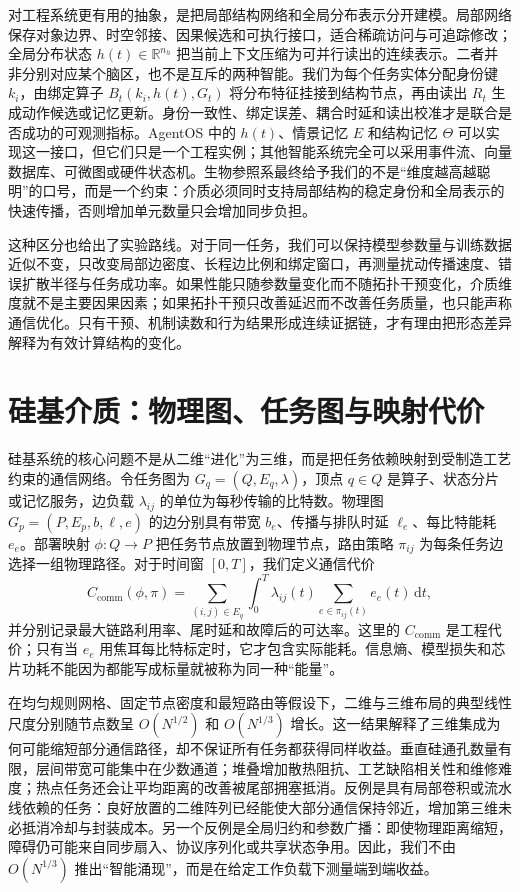 对工程系统更有用的抽象，是把局部结构网络和全局分布表示分开建模。局部网络保存对象边界、时空邻接、因果候选和可执行接口，适合稀疏访问与可追踪修改；全局分布状态 $h(t)\in\mathbb{R}^{n_h}$ 把当前上下文压缩为可并行读出的连续表示。二者并非分别对应某个脑区，也不是互斥的两种智能。我们为每个任务实体分配身份键 $k_i$，由绑定算子 $B_t(k_i,h(t),G_t)$ 将分布特征挂接到结构节点，再由读出 $R_t$ 生成动作候选或记忆更新。身份一致性、绑定误差、耦合时延和读出校准才是联合是否成功的可观测指标。AgentOS 中的 $h(t)$、情景记忆 $E$ 和结构记忆 $\Theta$ 可以实现这一接口，但它们只是一个工程实例；其他智能系统完全可以采用事件流、向量数据库、可微图或硬件状态机。生物参照系最终给予我们的不是“维度越高越聪明”的口号，而是一个约束：介质必须同时支持局部结构的稳定身份和全局表示的快速传播，否则增加单元数量只会增加同步负担。

这种区分也给出了实验路线。对于同一任务，我们可以保持模型参数量与训练数据近似不变，只改变局部边密度、长程边比例和绑定窗口，再测量扰动传播速度、错误扩散半径与任务成功率。如果性能只随参数量变化而不随拓扑干预变化，介质维度就不是主要因果因素；如果拓扑干预只改善延迟而不改善任务质量，也只能声称通信优化。只有干预、机制读数和行为结果形成连续证据链，才有理由把形态差异解释为有效计算结构的变化。

\section{硅基介质：物理图、任务图与映射代价}
\label{sec:section_2750}

硅基系统的核心问题不是从二维“进化”为三维，而是把任务依赖映射到受制造工艺约束的通信网络。令任务图为 $G_q=(Q,E_q,\lambda)$，顶点 $q\in Q$ 是算子、状态分片或记忆服务，边负载 $\lambda_{ij}$ 的单位为每秒传输的比特数。物理图 $G_p=(P,E_p,b,\ell,e)$ 的边分别具有带宽 $b_e$、传播与排队时延 $\ell_e$、每比特能耗 $e_e$。部署映射 $\phi:Q\rightarrow P$ 把任务节点放置到物理节点，路由策略 $\pi_{ij}$ 为每条任务边选择一组物理路径。对于时间窗 $[0,T]$，我们定义通信代价
\[
C_{\mathrm{comm}}(\phi,\pi)
=\sum_{(i,j)\in E_q}\int_0^T
\lambda_{ij}(t)\!\sum_{e\in\pi_{ij}(t)} e_e(t)\,\mathrm dt,
\]
并分别记录最大链路利用率、尾时延和故障后的可达率。这里的 $C_{\mathrm{comm}}$ 是工程代价；只有当 $e_e$ 用焦耳每比特标定时，它才包含实际能耗。信息熵、模型损失和芯片功耗不能因为都能写成标量就被称为同一种“能量”。

在均匀规则网格、固定节点密度和最短路由等假设下，二维与三维布局的典型线性尺度分别随节点数呈 $O(N^{1/2})$ 和 $O(N^{1/3})$ 增长。这一结果解释了三维集成为何可能缩短部分通信路径，却不保证所有任务都获得同样收益。垂直硅通孔数量有限，层间带宽可能集中在少数通道；堆叠增加散热阻抗、工艺缺陷相关性和维修难度；热点任务还会让平均距离的改善被尾部拥塞抵消。反例是具有局部卷积或流水线依赖的任务：良好放置的二维阵列已经能使大部分通信保持邻近，增加第三维未必抵消冷却与封装成本。另一个反例是全局归约和参数广播：即使物理距离缩短，障碍仍可能来自同步扇入、协议序列化或共享状态争用。因此，我们不由 $O(N^{1/3})$ 推出“智能涌现”，而是在给定工作负载下测量端到端收益。

